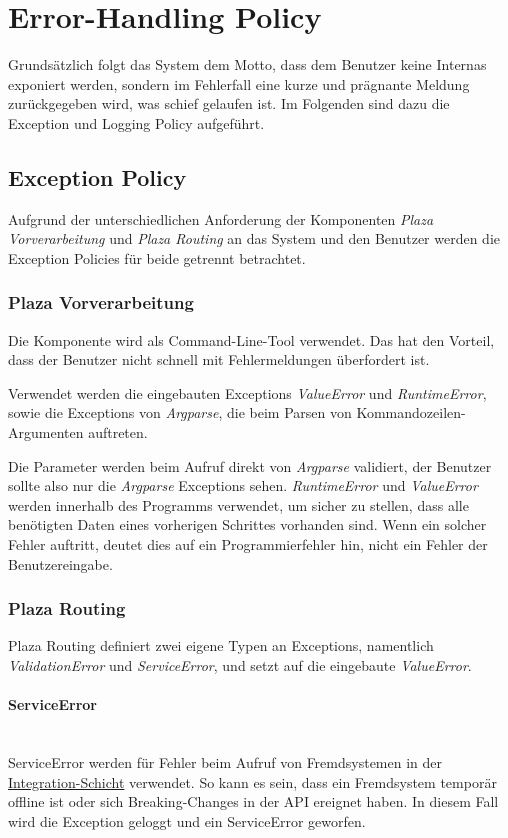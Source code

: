 
\section{Error-Handling Policy}
\label{sec:Error-Handling Policy}
Grundsätzlich folgt das System dem Motto, dass dem Benutzer keine Internas exponiert werden, sondern im Fehlerfall eine kurze und prägnante Meldung zurückgegeben wird, was schief gelaufen ist. Im Folgenden sind dazu die Exception und Logging Policy aufgeführt.

\subsection{Exception Policy}
\label{ehp:Exception Policy}
Aufgrund der unterschiedlichen Anforderung der Komponenten \emph{Plaza Vorverarbeitung} und \emph{Plaza Routing} an das System und den Benutzer werden die Exception Policies für beide getrennt betrachtet.

\subsubsection{Plaza Vorverarbeitung}
\label{ehp:Plaza Vorverarbeitung}
Die Komponente wird als Command-Line-Tool verwendet. Das hat den Vorteil, dass der Benutzer nicht schnell mit Fehlermeldungen überfordert ist. 

Verwendet werden die eingebauten Exceptions \emph{ValueError} und \emph{RuntimeError}, sowie die Exceptions von \emph{Argparse}, die beim Parsen von Kommandozeilen-Argumenten auftreten.

Die Parameter werden beim Aufruf direkt von \emph{Argparse} validiert, der Benutzer sollte also nur die \emph{Argparse} Exceptions sehen. \emph{RuntimeError} und \emph{ValueError} werden innerhalb des Programms verwendet, um sicher zu stellen, dass alle benötigten Daten eines vorherigen Schrittes vorhanden sind. Wenn ein solcher Fehler auftritt, deutet dies auf ein Programmierfehler hin, nicht ein Fehler der Benutzereingabe.

\subsubsection{Plaza Routing}
\label{ehp:Plaza Routing}
Plaza Routing definiert zwei eigene Typen an Exceptions, namentlich \emph{ValidationError} und \emph{ServiceError}, und setzt auf die eingebaute \emph{ValueError}. 

\paragraph{ServiceError}\label{ehp:PR:ServiceError}~\\
ServiceError werden für Fehler beim Aufruf von Fremdsystemen in der \hyperref[architektur:integration-layer]{Integration-Schicht} verwendet. So kann es sein, dass ein Fremdsystem temporär offline ist oder sich Breaking-Changes in der \ac{API} ereignet haben. In diesem Fall wird die Exception geloggt und ein ServiceError geworfen.


